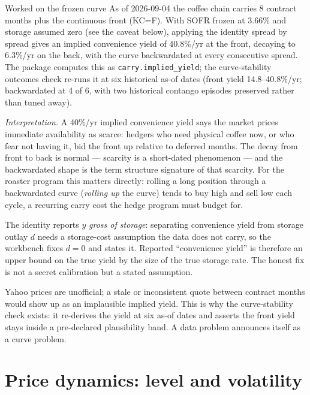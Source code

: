 \documentclass[11pt,a4paper]{article}
\begin{document}
\begin{concept}{Worked on the frozen curve}
As of 2026-09-04 the coffee chain carries 8 contract months plus the
continuous front (KC=F). With SOFR frozen at 3.66\% and storage assumed
zero (see the caveat below), applying the identity spread by spread gives
an implied convenience yield of 40.8\%/yr at the front, decaying to
6.3\%/yr on the back, with the curve backwardated at every consecutive
spread. The package computes this as \texttt{carry.implied\_yield}; the
curve-stability outcomes check re-runs it at six historical as-of dates
(front yield 14.8--40.8\%/yr; backwardated at 4 of 6, with two historical
contango episodes preserved rather than tuned away).
\end{concept}

\emph{Interpretation.} A 40\%/yr implied convenience yield says the market
prices immediate availability as scarce: hedgers who need physical coffee
now, or who fear not having it, bid the front up relative to deferred
months. The decay from front to back is normal --- scarcity is a
short-dated phenomenon --- and the backwardated shape is the term
structure signature of that scarcity. For the roaster program this matters
directly: rolling a long position through a backwardated curve
(\emph{rolling up} the curve) tends to buy high and sell low each cycle, a
recurring carry cost the hedge program must budget for.

\begin{pitfall}
The identity reports $y$ \emph{gross of storage}: separating convenience
yield from storage outlay $d$ needs a storage-cost assumption the data
does not carry, so the workbench fixes $d=0$ and states it. Reported
``convenience yield'' is therefore an upper bound on the true yield by the
size of the true storage rate. The honest fix is not a secret calibration
but a stated assumption.
\end{pitfall}

\begin{pitfall}
Yahoo prices are unofficial; a stale or inconsistent quote between
contract months would show up as an implausible implied yield. This is why
the curve-stability check exists: it re-derives the yield at six as-of
dates and asserts the front yield stays inside a pre-declared plausibility
band. A data problem announces itself as a curve problem.
\end{pitfall}

\section{Price dynamics: level and volatility}
\label{ch:dynamics}
\end{document}
